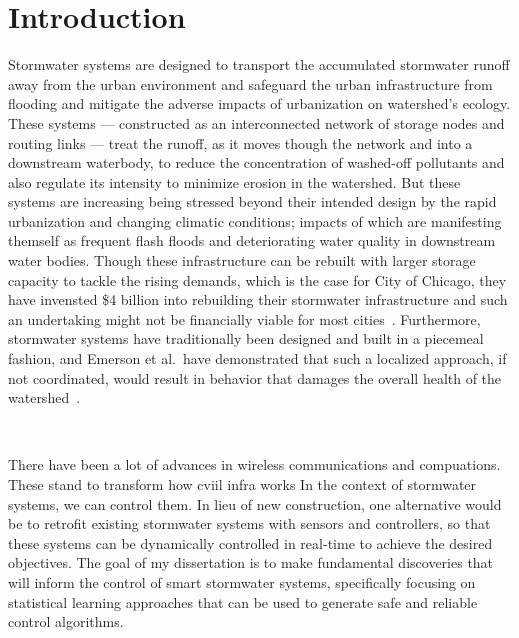 \chapter{Introduction}\label{ch:introduction}
Stormwater systems are designed to transport the accumulated stormwater runoff away from the urban environment and safeguard the urban infrastructure from flooding and mitigate the adverse impacts of urbanization on watershed's ecology.
These systems --- constructed as an interconnected network of storage nodes and routing links --- treat the runoff, as it moves though the network and into a downstream waterbody, to reduce the concentration of washed-off pollutants and also regulate its intensity to minimize erosion in the watershed. 
But these systems are increasing being stressed beyond their intended design by the rapid urbanization and changing climatic conditions; impacts of which are manifesting themself as frequent flash floods and deteriorating water quality in downstream water bodies.
Though these infrastructure can be rebuilt with larger storage capacity to tackle the rising demands, which is the case for City of Chicago, they have invensted \$4 billion into rebuilding their stormwater infrastructure and such an undertaking might not be financially viable for most cities~\cite{}.
Furthermore, stormwater systems have traditionally been designed and built in a piecemeal fashion, and Emerson et al.\ have demonstrated that such a localized approach, if not coordinated, would result in behavior that damages the overall health of the watershed~\cite{Emerson2005Watershed-ScaleBasins}.

\

There have been a lot of advances in wireless communications and compuations.
These stand to transform how cviil infra works
In the context of stormwater systems, we can control them.
In lieu of new construction, one alternative would be to retrofit  existing stormwater systems with sensors and controllers, so that these systems can be dynamically controlled in real-time to achieve the desired objectives.
The goal of my dissertation is to make fundamental discoveries that will inform the control of smart stormwater systems, specifically focusing on statistical learning approaches that can be used to generate safe and reliable control algorithms.


